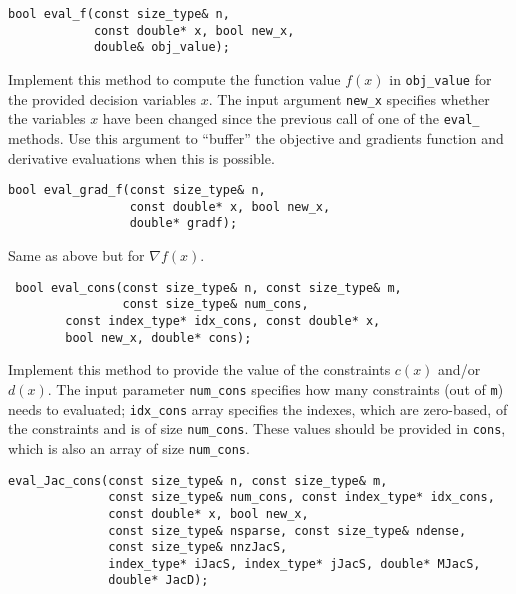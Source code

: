 \documentclass[11pt]{article}
\begin{document}
\begin{lstlisting} 
bool eval_f(const size_type& n, 
            const double* x, bool new_x, 
            double& obj_value);
\end{lstlisting} 

\noindent Implement this method to compute the function value $f(x)$ in \texttt{obj\_value} for the provided decision variables $x$. The input argument \texttt{new\_x} specifies whether the variables $x$ have been changed since the previous call of one of the \texttt{eval\_} methods. Use this argument to ``buffer'' the objective and gradients function and derivative evaluations when this is possible.

\begin{lstlisting} 
bool eval_grad_f(const size_type& n, 
                 const double* x, bool new_x, 
                 double* gradf);
\end{lstlisting} 

\noindent Same as above but for $\nabla f(x)$.

\begin{lstlisting} 
 bool eval_cons(const size_type& n, const size_type& m, 
                const size_type& num_cons,
		const index_type* idx_cons, const double* x, 
		bool new_x, double* cons);
\end{lstlisting} 

\noindent Implement this method to provide the value of the constraints $c(x)$ and/or $d(x)$. The input parameter \texttt{num\_cons} specifies how many constraints (out of \texttt{m}) needs to evaluated; \texttt{idx\_cons} array specifies the indexes, which are zero-based, of the constraints  and is of size \texttt{num\_cons}. These values should be provided in \texttt{cons}, which is also an array of size \texttt{num\_cons}.

\begin{lstlisting} 
eval_Jac_cons(const size_type& n, const size_type& m, 
              const size_type& num_cons, const index_type* idx_cons,
              const double* x, bool new_x,
              const size_type& nsparse, const size_type& ndense,
              const size_type& nnzJacS,
              index_type* iJacS, index_type* jJacS, double* MJacS, 
              double* JacD);
\end{lstlisting} 

\end{document}

